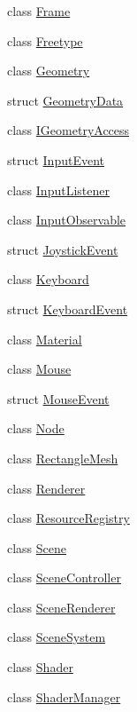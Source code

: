 \begin{DoxyCompactItemize}
\item 
class \mbox{\hyperlink{classec_1_1_frame}{Frame}}
\item 
class \mbox{\hyperlink{classec_1_1_freetype}{Freetype}}
\item 
class \mbox{\hyperlink{classec_1_1_geometry}{Geometry}}
\item 
struct \mbox{\hyperlink{structec_1_1_geometry_data}{Geometry\+Data}}
\item 
class \mbox{\hyperlink{classec_1_1_i_geometry_access}{I\+Geometry\+Access}}
\item 
struct \mbox{\hyperlink{structec_1_1_input_event}{Input\+Event}}
\item 
class \mbox{\hyperlink{classec_1_1_input_listener}{Input\+Listener}}
\item 
class \mbox{\hyperlink{classec_1_1_input_observable}{Input\+Observable}}
\item 
struct \mbox{\hyperlink{structec_1_1_joystick_event}{Joystick\+Event}}
\item 
class \mbox{\hyperlink{classec_1_1_keyboard}{Keyboard}}
\item 
struct \mbox{\hyperlink{structec_1_1_keyboard_event}{Keyboard\+Event}}
\item 
class \mbox{\hyperlink{classec_1_1_material}{Material}}
\item 
class \mbox{\hyperlink{classec_1_1_mouse}{Mouse}}
\item 
struct \mbox{\hyperlink{structec_1_1_mouse_event}{Mouse\+Event}}
\item 
class \mbox{\hyperlink{classec_1_1_node}{Node}}
\item 
class \mbox{\hyperlink{classec_1_1_rectangle_mesh}{Rectangle\+Mesh}}
\item 
class \mbox{\hyperlink{classec_1_1_renderer}{Renderer}}
\item 
class \mbox{\hyperlink{classec_1_1_resource_registry}{Resource\+Registry}}
\item 
class \mbox{\hyperlink{classec_1_1_scene}{Scene}}
\item 
class \mbox{\hyperlink{classec_1_1_scene_controller}{Scene\+Controller}}
\item 
class \mbox{\hyperlink{classec_1_1_scene_renderer}{Scene\+Renderer}}
\item 
class \mbox{\hyperlink{classec_1_1_scene_system}{Scene\+System}}
\item 
class \mbox{\hyperlink{classec_1_1_shader}{Shader}}
\item 
class \mbox{\hyperlink{classec_1_1_shader_manager}{Shader\+Manager}}

\end{DoxyCompactItemize}
